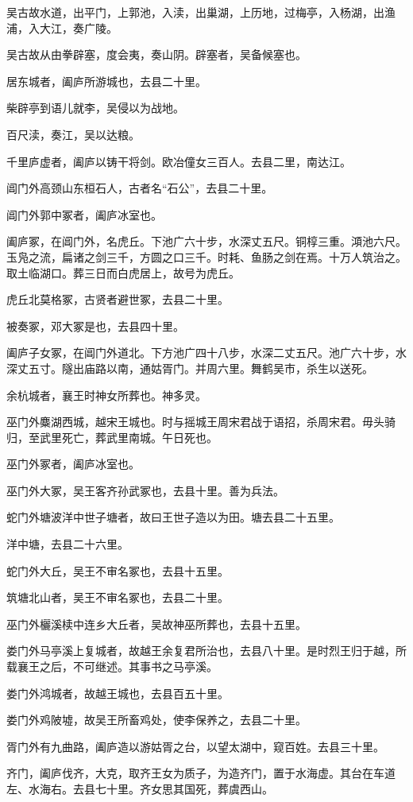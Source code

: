 \documentclass[12pt,UTF8]{ctexbook}
\begin{document}
吴古故水道，出平门，上郭池，入渎，出巢湖，上历地，过梅亭，入杨湖，出渔浦，入大江，奏广陵。

吴古故从由拳辟塞，度会夷，奏山阴。辟塞者，吴备候塞也。

居东城者，阖庐所游城也，去县二十里。

柴辟亭到语儿就李，吴侵以为战地。

百尺渎，奏江，吴以达粮。

千里庐虚者，阖庐以铸干将剑。欧冶僮女三百人。去县二里，南达江。

阊门外高颈山东桓石人，古者名“石公”，去县二十里。

阊门外郭中冢者，阖庐冰室也。

阖庐冢，在阊门外，名虎丘。下池广六十步，水深丈五尺。铜椁三重。澒池六尺。玉凫之流，扁诸之剑三千，方圆之口三千。时耗、鱼肠之剑在焉。十万人筑治之。取土临湖口。葬三日而白虎居上，故号为虎丘。

虎丘北莫格冢，古贤者避世冢，去县二十里。

被奏冢，邓大冢是也，去县四十里。

阖庐子女冢，在阊门外道北。下方池广四十八步，水深二丈五尺。池广六十步，水深丈五寸。隧出庙路以南，通姑胥门。并周六里。舞鹤吴市，杀生以送死。

余杭城者，襄王时神女所葬也。神多灵。

巫门外麋湖西城，越宋王城也。时与摇城王周宋君战于语招，杀周宋君。毋头骑归，至武里死亡，葬武里南城。午日死也。

巫门外冢者，阖庐冰室也。

巫门外大冢，吴王客齐孙武冢也，去县十里。善为兵法。

蛇门外塘波洋中世子塘者，故曰王世子造以为田。塘去县二十五里。

洋中塘，去县二十六里。

蛇门外大丘，吴王不审名冢也，去县十五里。

筑塘北山者，吴王不审名冢也，去县二十里。

巫门外欐溪椟中连乡大丘者，吴故神巫所葬也，去县十五里。

娄门外马亭溪上复城者，故越王余复君所治也，去县八十里。是时烈王归于越，所载襄王之后，不可继述。其事书之马亭溪。

娄门外鸿城者，故越王城也，去县百五十里。

娄门外鸡陂墟，故吴王所畜鸡处，使李保养之，去县二十里。

胥门外有九曲路，阖庐造以游姑胥之台，以望太湖中，窥百姓。去县三十里。

齐门，阖庐伐齐，大克，取齐王女为质子，为造齐门，置于水海虚。其台在车道左、水海右。去县七十里。齐女思其国死，葬虞西山。
\end{document}
